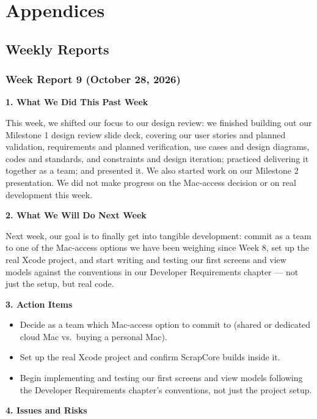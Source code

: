 \part{Appendices}

\chapter{Weekly Reports}

\section{Week Report 9 (October 28, 2026)}

\noindent\textbf{1. What We Did This Past Week}

This week, we shifted our focus to our design review: we finished building out our Milestone 1 design review slide deck, covering our user stories and planned validation, requirements and planned verification, use cases and design diagrams, codes and standards, and constraints and design iteration; practiced delivering it together as a team; and presented it. We also started work on our Milestone 2 presentation. We did not make progress on the Mac-access decision or on real development this week.

\noindent\textbf{2. What We Will Do Next Week}

Next week, our goal is to finally get into tangible development: commit as a team to one of the Mac-access options we have been weighing since Week 8, set up the real Xcode project, and start writing and testing our first screens and view models against the conventions in our Developer Requirements chapter --- not just the setup, but real code.

\noindent\textbf{3. Action Items}
\begin{itemize}
\item Decide as a team which Mac-access option to commit to (shared or dedicated cloud Mac vs.\ buying a personal Mac).
\item Set up the real Xcode project and confirm ScrapCore builds inside it.
\item Begin implementing and testing our first screens and view models following the Developer Requirements chapter's conventions, not just the project setup.
\end{itemize}

\noindent\textbf{4. Issues and Risks}

